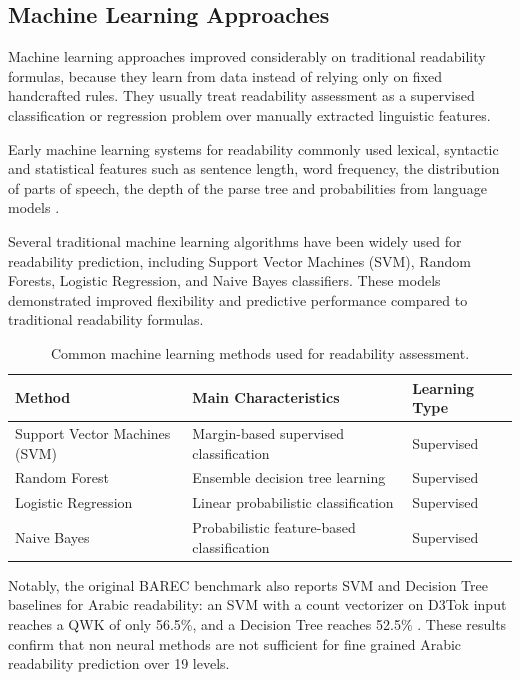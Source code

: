 \subsection{Machine Learning Approaches}

Machine learning approaches improved considerably on traditional readability formulas, because they learn from data instead of relying only on fixed handcrafted rules. They usually treat readability assessment as a supervised classification or regression problem over manually extracted linguistic features.

Early machine learning systems for readability commonly used lexical, syntactic and statistical features such as sentence length, word frequency, the distribution of parts of speech, the depth of the parse tree and probabilities from language models \cite{schwarm2005reading}.

Several traditional machine learning algorithms have been widely used for readability prediction, including Support Vector Machines (SVM), Random Forests, Logistic Regression, and Naive Bayes classifiers. These models demonstrated improved flexibility and predictive performance compared to traditional readability formulas.

\begin{table}[H]

\centering

\caption{Common machine learning methods used for readability assessment.}

\label{tab:ml_readability}

\begin{tabular}{p{4cm} p{7cm} p{2.5cm}}

\toprule

\textbf{Method} & \textbf{Main Characteristics} & \textbf{Learning Type} \\

\midrule

Support Vector Machines (SVM) & Margin-based supervised classification & Supervised \\

Random Forest & Ensemble decision tree learning & Supervised \\

Logistic Regression & Linear probabilistic classification & Supervised \\

Naive Bayes & Probabilistic feature-based classification & Supervised \\

\bottomrule

\end{tabular}

\end{table}
Notably, the original BAREC benchmark also reports SVM and Decision Tree baselines for Arabic readability: an SVM with a count vectorizer on D3Tok input reaches a QWK of only 56.5\%, and a Decision Tree reaches 52.5\% \cite{elmadani2025barec}. These results confirm that non neural methods are not sufficient for fine grained Arabic readability prediction over 19 levels.
